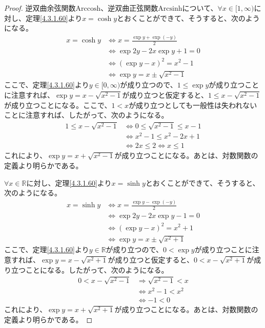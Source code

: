 \documentclass[dvipdfmx]{jsarticle}
\begin{document}
\begin{proof}
逆双曲余弦関数$\mathrm{Arccosh}$、逆双曲正弦関数$\mathrm{Arcsinh}$について、$\forall x \in [ 1,\infty)$に対し、定理\ref{4.3.1.60}より$x = \cosh y$とおくことができて、そうすると、次のようになる。
\begin{align*}
x = \cosh y &\Leftrightarrow x = \frac{\exp y + \exp( - y)}{2}\\
&\Leftrightarrow \exp{2y} - 2x\exp y + 1 = 0\\
&\Leftrightarrow \left( \exp y - x \right)^{2} = x^{2} - 1\\
&\Leftrightarrow \exp y = x \pm \sqrt{x^{2} - 1}
\end{align*}
ここで、定理\ref{4.3.1.60}より$y \in [ 0,\infty)$が成り立つので、$1 \leq \exp y$が成り立つことに注意すれば、$\exp y = x - \sqrt{x^{2} - 1}$が成り立つと仮定すると、$1 \leq x - \sqrt{x^{2} - 1}$が成り立つことになる。ここで、$1 < x$が成り立つとしても一般性は失われないことに注意すれば、したがって、次のようになる。
\begin{align*}
1 \leq x - \sqrt{x^{2} - 1} &\Leftrightarrow 0 \leq \sqrt{x^{2} - 1} \leq x - 1\\
&\Leftrightarrow x^{2} - 1 \leq x^{2} - 2x + 1\\
&\Leftrightarrow 2x \leq 2 \Leftrightarrow x \leq 1
\end{align*}
これにより、$\exp y = x + \sqrt{x^{2} - 1}$が成り立つことになる。あとは、対数関数の定義より明らかである。\par
$\forall x \in \mathbb{R}$に対し、定理\ref{4.3.1.60}より$x = \sinh y$とおくことができて、そうすると、次のようになる。
\begin{align*}
x = \sinh y &\Leftrightarrow x = \frac{\exp y - \exp( - y)}{2}\\
&\Leftrightarrow \exp{2y} - 2x\exp y - 1 = 0\\
&\Leftrightarrow \left( \exp y - x \right)^{2} = x^{2} + 1\\
&\Leftrightarrow \exp y = x \pm \sqrt{x^{2} + 1}
\end{align*}
ここで、定理\ref{4.3.1.60}より$y \in \mathbb{R}$が成り立つので、$0 < \exp y$が成り立つことに注意すれば、$\exp y = x - \sqrt{x^{2} + 1}$が成り立つと仮定すると、$0 < x - \sqrt{x^{2} + 1}$が成り立つことになる。したがって、次のようになる。
\begin{align*}
0 < x - \sqrt{x^{2} - 1} &\Rightarrow \sqrt{x^{2} - 1} < x\\
&\Leftrightarrow x^{2} - 1 < x^{2}\\
&\Leftrightarrow - 1 < 0
\end{align*}
これにより、$\exp y = x + \sqrt{x^{2} + 1}$が成り立つことになる。あとは、対数関数の定義より明らかである。
\end{proof}
\end{document}

